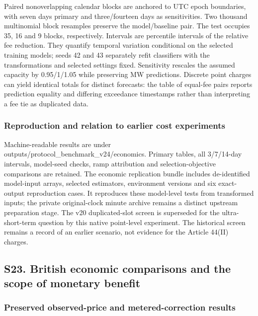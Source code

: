 \documentclass[a4paper,11pt]{article}
\begin{document}
Paired nonoverlapping calendar blocks are anchored to UTC epoch boundaries, with seven days primary and three/fourteen days as sensitivities. Two thousand multinomial block resamples preserve the model/baseline pair. The test occupies 35, 16 and 9 blocks, respectively. Intervals are percentile intervals of the relative fee reduction. They quantify temporal variation conditional on the selected training models; seeds 42 and 43 separately refit classifiers with the transformations and selected settings fixed. Sensitivity rescales the assumed capacity by 0.95/1/1.05 while preserving MW predictions. Discrete point charges can yield identical totals for distinct forecasts: the table of equal-fee pairs reports prediction equality and differing exceedance timestamps rather than interpreting a fee tie as duplicated data.

\subsubsection{Reproduction and relation to earlier cost experiments}\label{reproduction-and-relation-to-earlier-cost-experiments}

Machine-readable results are under outputs/protocol\_benchmark\_v24/economics. Primary tables, all 3/7/14-day intervals, model-seed checks, ramp attribution and selection-objective comparisons are retained. The economic replication bundle includes de-identified model-input arrays, selected estimators, environment versions and six exact-output reproduction cases. It reproduces these model-level tests from transformed inputs; the private original-clock minute archive remains a distinct upstream preparation stage. The v20 duplicated-slot screen is superseded for the ultra-short-term question by this native point-level experiment. The historical screen remains a record of an earlier scenario, not evidence for the Article 44(II) charges.

\subsection{S23. British economic comparisons and the scope of monetary benefit}\label{s23.-british-economic-comparisons-and-the-scope-of-monetary-benefit}

\subsubsection{Preserved observed-price and metered-correction results}\label{preserved-observed-price-and-metered-correction-results}
\end{document}
